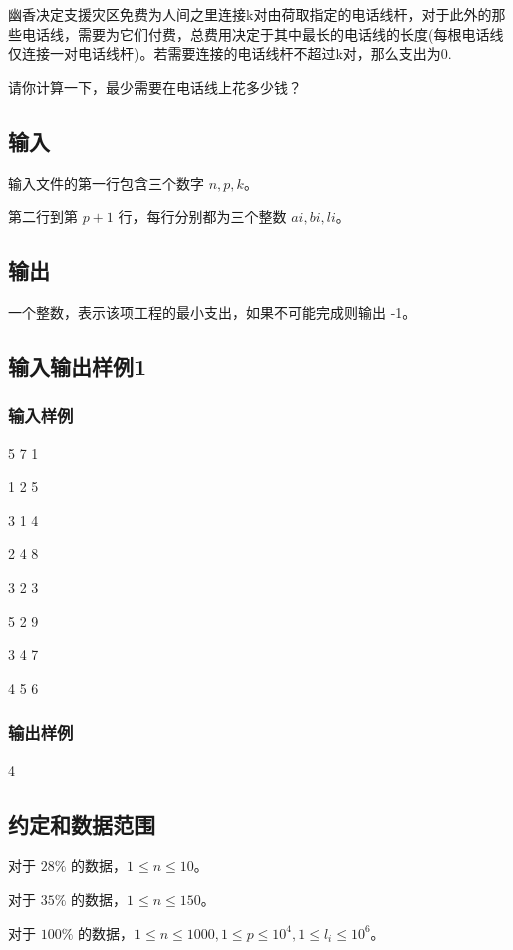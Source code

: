 \documentclass[UTF8]{ctexart}
\begin{document}
幽香决定支援灾区免费为人间之里连接k对由荷取指定的电话线杆，对于此外的那些电话线，需要为它们付费，总费用决定于其中最长的电话线的长度(每根电话线仅连接一对电话线杆)。若需要连接的电话线杆不超过k对，那么支出为0.

请你计算一下，最少需要在电话线上花多少钱？

\subsection{输入}

输入文件的第一行包含三个数字 $n,p,k$。

第二行到第 $p+1$ 行，每行分别都为三个整数 $ai,bi,li$。

\subsection{输出}

一个整数，表示该项工程的最小支出，如果不可能完成则输出 -1。

\subsection{输入输出样例1}
\subsubsection{输入样例}

5 7 1

1 2 5

3 1 4

2 4 8

3 2 3

5 2 9

3 4 7

4 5 6

\subsubsection{输出样例}

4


\subsection{约定和数据范围}

对于 $28\%$ 的数据，$1\le n \le 10$。  

对于 $35\%$ 的数据，$1\le n\le 150$。

对于 $100\%$ 的数据，$1\le n\le 1000,1\le p\le 10^4,1\le l_i\le 10^6$。
\end{document}
